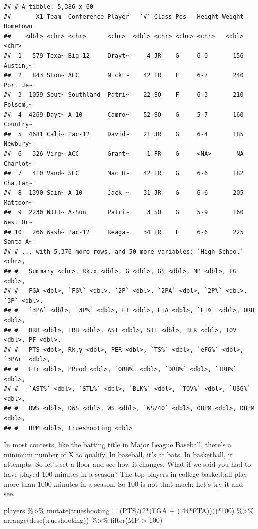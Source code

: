 \documentclass[
]{book}
\newenvironment{Shaded}{\begin{snugshade}}{\end{snugshade}}
\newcommand{\AttributeTok}[1]{\textcolor[rgb]{0.77,0.63,0.00}{#1}}
\newcommand{\DecValTok}[1]{\textcolor[rgb]{0.00,0.00,0.81}{#1}}
\newcommand{\FunctionTok}[1]{\textcolor[rgb]{0.00,0.00,0.00}{#1}}
\newcommand{\NormalTok}[1]{#1}
\newcommand{\SpecialCharTok}[1]{\textcolor[rgb]{0.00,0.00,0.00}{#1}}
\begin{document}
\begin{verbatim}
## # A tibble: 5,386 x 60
##       X1 Team  Conference Player   `#` Class Pos   Height Weight Hometown
##    <dbl> <chr> <chr>      <chr>  <dbl> <chr> <chr> <chr>   <dbl> <chr>   
##  1   579 Texa~ Big 12     Drayt~     4 JR    G     6-0       156 Austin,~
##  2   843 Ston~ AEC        Nick ~    42 FR    F     6-7       240 Port Je~
##  3  1059 Sout~ Southland  Patri~    22 SO    F     6-3       210 Folsom,~
##  4  4269 Dayt~ A-10       Camro~    52 SO    G     5-7       160 Country~
##  5  4681 Cali~ Pac-12     David~    21 JR    G     6-4       185 Newbury~
##  6   326 Virg~ ACC        Grant~     1 FR    G     <NA>       NA Charlot~
##  7   410 Vand~ SEC        Mac H~    42 FR    G     6-6       182 Chattan~
##  8  1390 Sain~ A-10       Jack ~    31 JR    G     6-6       205 Mattoon~
##  9  2230 NJIT~ A-Sun      Patri~     3 SO    G     5-9       160 West Or~
## 10   266 Wash~ Pac-12     Reaga~    34 FR    F     6-6       225 Santa A~
## # ... with 5,376 more rows, and 50 more variables: `High School` <chr>,
## #   Summary <chr>, Rk.x <dbl>, G <dbl>, GS <dbl>, MP <dbl>, FG <dbl>,
## #   FGA <dbl>, `FG%` <dbl>, `2P` <dbl>, `2PA` <dbl>, `2P%` <dbl>, `3P` <dbl>,
## #   `3PA` <dbl>, `3P%` <dbl>, FT <dbl>, FTA <dbl>, `FT%` <dbl>, ORB <dbl>,
## #   DRB <dbl>, TRB <dbl>, AST <dbl>, STL <dbl>, BLK <dbl>, TOV <dbl>, PF <dbl>,
## #   PTS <dbl>, Rk.y <dbl>, PER <dbl>, `TS%` <dbl>, `eFG%` <dbl>, `3PAr` <dbl>,
## #   FTr <dbl>, PProd <dbl>, `ORB%` <dbl>, `DRB%` <dbl>, `TRB%` <dbl>,
## #   `AST%` <dbl>, `STL%` <dbl>, `BLK%` <dbl>, `TOV%` <dbl>, `USG%` <dbl>,
## #   OWS <dbl>, DWS <dbl>, WS <dbl>, `WS/40` <dbl>, OBPM <dbl>, DBPM <dbl>,
## #   BPM <dbl>, trueshooting <dbl>
\end{verbatim}

In most contests, like the batting title in Major League Baseball, there's a minimum number of X to qualify. In baseball, it's at bats. In basketball, it attempts. So let's set a floor and see how it changes. What if we said you had to have played 100 minutes in a season? The top players in college basketball play more than 1000 minutes in a season. So 100 is not that much. Let's try it and see.

\begin{Shaded}
\begin{Highlighting}[]
\NormalTok{players }\SpecialCharTok{\%\textgreater{}\%}
  \FunctionTok{mutate}\NormalTok{(}\AttributeTok{trueshooting =}\NormalTok{ (PTS}\SpecialCharTok{/}\NormalTok{(}\DecValTok{2}\SpecialCharTok{*}\NormalTok{(FGA }\SpecialCharTok{+}\NormalTok{ (.}\DecValTok{44}\SpecialCharTok{*}\NormalTok{FTA))))}\SpecialCharTok{*}\DecValTok{100}\NormalTok{) }\SpecialCharTok{\%\textgreater{}\%}
  \FunctionTok{arrange}\NormalTok{(}\FunctionTok{desc}\NormalTok{(trueshooting)) }\SpecialCharTok{\%\textgreater{}\%}
  \FunctionTok{filter}\NormalTok{(MP }\SpecialCharTok{\textgreater{}} \DecValTok{100}\NormalTok{)}
\end{Highlighting}
\end{Shaded}
\end{document}
